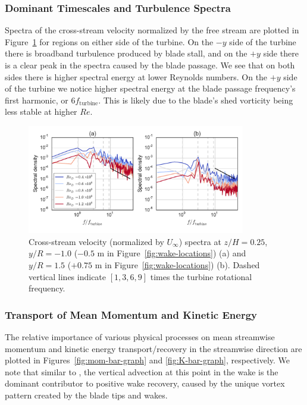 \documentclass[energies,article,accept,moreauthors,pdftex,12pt,a4paper]{mdpi}
\begin{document}
\subsubsection{Dominant Timescales and Turbulence Spectra}

Spectra of the cross-stream velocity normalized by the free stream are plotted
in Figure~\ref{fig:wake-spectra} for regions on either side of the turbine. On
the $-y$ side of the turbine there is broadband turbulence produced by blade
stall, and on the $+y$ side there is a clear peak in the spectra caused by the
blade passage. We see that on both sides there is higher spectral energy at
lower Reynolds numbers. On the $+y$ side of the turbine we notice higher
spectral energy at the blade passage frequency's first harmonic, or $6
f_\mathrm{turbine}$. This is likely due to the blade's shed vorticity being less
stable at higher $Re$.

\begin{figure}[ht!]
\centering

\includegraphics[width=0.85\textwidth]{figures/wake_spectra}

\caption{Cross-stream velocity (normalized by $U_\infty$) spectra at $z/H=0.25$,
    $y/R=-1.0$ ($-0.5$ m in Figure~\ref{fig:wake-locations}) (a) and $y/R=1.5$
    ($+0.75$ m in Figure~\ref{fig:wake-locations}) (b). Dashed vertical lines
    indicate $[1, 3, 6, 9]$ times the turbine rotational frequency.}

\label{fig:wake-spectra}
\end{figure}



\subsubsection{Transport of Mean Momentum and Kinetic Energy}

The relative importance of various physical processes on mean streamwise
momentum and kinetic energy transport/recovery in the streamwise direction are
plotted in Figures~\ref{fig:mom-bar-graph} and \ref{fig:K-bar-graph},
respectively. We note that similar to \cite{Bachant2015-JoT}, the vertical
advection at this point in the wake is the dominant contributor to positive wake
recovery, caused by the unique vortex pattern created by the blade tips and
wakes.
\end{document}
